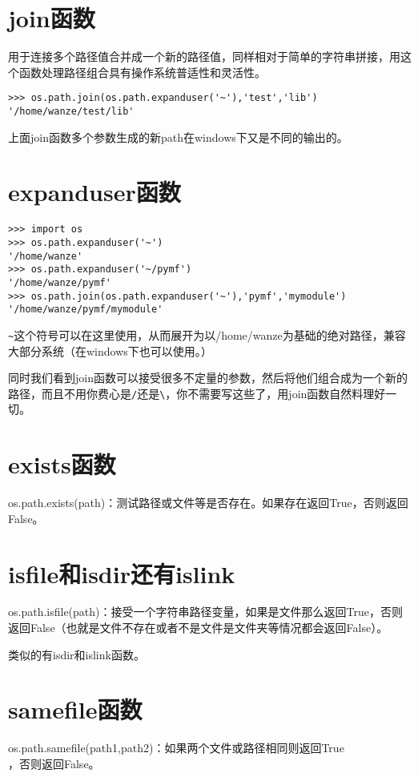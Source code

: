 \documentclass[12pt,oneside]{book}
\begin{document}
\begin{common-format}
\section{join函数}
用于连接多个路径值合并成一个新的路径值，同样相对于简单的字符串拼接，用这个函数处理路径组合具有操作系统普适性和灵活性。
\begin{Verbatim}
>>> os.path.join(os.path.expanduser('~'),'test','lib')
'/home/wanze/test/lib'
\end{Verbatim}

上面join函数多个参数生成的新path在windows下又是不同的输出的。



\section{expanduser函数}
\begin{Verbatim}
>>> import os
>>> os.path.expanduser('~')
'/home/wanze'
>>> os.path.expanduser('~/pymf')
'/home/wanze/pymf'
>>> os.path.join(os.path.expanduser('~'),'pymf','mymodule')
'/home/wanze/pymf/mymodule'
\end{Verbatim}

\verb+~+这个符号可以在这里使用，从而展开为以/home/wanze为基础的绝对路径，兼容大部分系统（在windows下也可以使用。）

同时我们看到join函数可以接受很多不定量的参数，然后将他们组合成为一个新的路径，而且不用你费心是\verb+/+还是\verb+\+，你不需要写这些了，用join函数自然料理好一切。



\section{exists函数}
os.path.exists(path)：测试路径或文件等是否存在。如果存在返回True，否则返回False。

\section{isfile和isdir还有islink}
os.path.isfile(path)：接受一个字符串路径变量，如果是文件那么返回True，否则返回False（也就是文件不存在或者不是文件是文件夹等情况都会返回False）。

类似的有isdir和islink函数。


\section{samefile函数}
os.path.samefile(path1,path2)：如果两个文件或路径相同则返回True\\，否则返回False。


\end{common-format}
\end{document}

